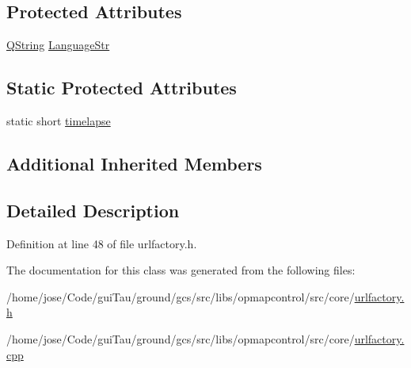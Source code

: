 \subsection*{Protected Attributes}
\begin{DoxyCompactItemize}
\item 
\hyperlink{group___u_a_v_objects_plugin_gab9d252f49c333c94a72f97ce3105a32d}{Q\-String} \hyperlink{group___o_p_map_widget_ga5d9399e074794da8ad0593e87e554228}{Language\-Str}
\end{DoxyCompactItemize}
\subsection*{Static Protected Attributes}
\begin{DoxyCompactItemize}
\item 
static short \hyperlink{group___o_p_map_widget_ga5dba09925e03ae10c70290f9a2e9cc61}{timelapse}
\end{DoxyCompactItemize}
\subsection*{Additional Inherited Members}


\subsection{Detailed Description}


Definition at line 48 of file urlfactory.\-h.



The documentation for this class was generated from the following files\-:\begin{DoxyCompactItemize}
\item 
/home/jose/\-Code/gui\-Tau/ground/gcs/src/libs/opmapcontrol/src/core/\hyperlink{urlfactory_8h}{urlfactory.\-h}\item 
/home/jose/\-Code/gui\-Tau/ground/gcs/src/libs/opmapcontrol/src/core/\hyperlink{urlfactory_8cpp}{urlfactory.\-cpp}\end{DoxyCompactItemize}
